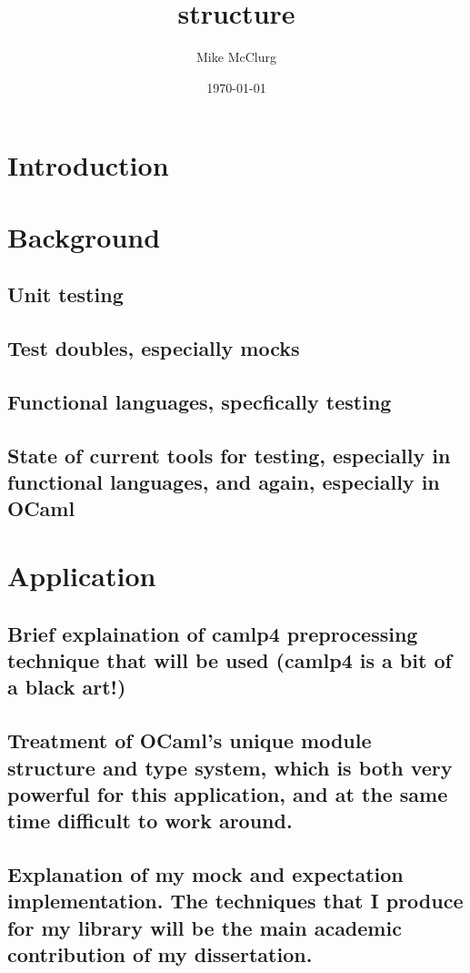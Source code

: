 \documentclass[11pt]{article}
\title{structure}
\author{Mike McClurg}
\date{\today}
\begin{document}
\maketitle

\setcounter{tocdepth}{3}
\tableofcontents
\vspace*{1cm}
\section{Introduction}
\label{sec-1}
\section{Background}
\label{sec-2}
\subsection{Unit testing}
\label{sec-2-1}
\subsection{Test doubles, especially mocks}
\label{sec-2-2}
\subsection{Functional languages, specfically testing}
\label{sec-2-3}
\subsection{State of current tools for testing, especially in functional languages, and again, especially in OCaml}
\label{sec-2-4}
\section{Application}
\label{sec-3}
\subsection{Brief explaination of camlp4 preprocessing technique that will be used (camlp4 is a bit of a black art!)}
\label{sec-3-1}
\subsection{Treatment of OCaml's unique module structure and type system, which is both very powerful for this application, and at the same time difficult to work around.}
\label{sec-3-2}
\subsection{Explanation of my mock and expectation implementation. The techniques that I produce for my library will be the main academic contribution of my dissertation.}
\label{sec-3-3}
\end{document}
